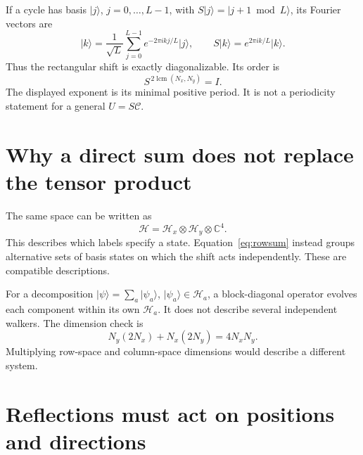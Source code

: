 \documentclass[11pt,a4paper,oneside]{report}
\newcommand{\ket}[1]{\lvert #1\rangle}
\newcommand{\HH}{\mathcal H}
\newcommand{\CC}{\mathcal C}
\newcommand{\Id}{I}
\numberwithin{equation}{chapter}
\begin{document}
If a cycle has basis \(\ket{j}\), \(j=0,\ldots,L-1\), with
\(S\ket{j}=\ket{j+1\bmod L}\), its Fourier vectors are
\begin{equation}
\ket{k}=\frac1{\sqrt L}\sum_{j=0}^{L-1}e^{-2\pi i kj/L}\ket{j},
\qquad S\ket{k}=e^{2\pi i k/L}\ket{k}.
\end{equation}
Thus the rectangular shift is exactly diagonalizable. Its order is
\begin{equation}
\boxed{S^{\,2\operatorname{lcm}(N_x,N_y)}=\Id.}
\end{equation}
The displayed exponent is its minimal positive period. It is not a
periodicity statement for a general \(U=S\CC\).

\section{Why a direct sum does not replace the tensor product}

The same space can be written as
\[
\HH=\HH_x\otimes\HH_y\otimes\mathbb C^4.
\]
This describes which labels specify a state. Equation~\eqref{eq:rowsum}
instead groups alternative sets of basis states on which the shift acts
independently. These are compatible descriptions.

For a decomposition \(\ket\psi=\sum_a\ket{\psi_a}\),
\(\ket{\psi_a}\in\HH_a\), a block-diagonal operator evolves each
component within its own \(\HH_a\). It does not describe several
independent walkers. The dimension check is
\[
N_y(2N_x)+N_x(2N_y)=4N_xN_y.
\]
Multiplying row-space and column-space dimensions would describe a
different system.

\section{Reflections must act on positions and directions}
\label{sec:rectsym}
\end{document}
